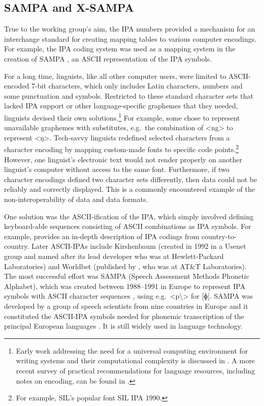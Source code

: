 \subsection*{SAMPA and X-SAMPA}
\label{sampa-xsampa}

True to the working group's aim, the IPA numbers provided a mechanism for 
an interchange standard for creating mapping tables to various 
computer encodings. For example, the IPA coding system was used as a mapping 
system in the creation of SAMPA \citep{Wells_etal1992}, an ASCII representation 
of the IPA symbols. 

For a long time, linguists, like all other computer users, were
limited to ASCII-encoded 7-bit characters, which only includes Latin characters,
numbers and some punctuation and symbols. Restricted to these standard character
sets that lacked IPA support or other language-specific graphemes that they
needed, linguists devised their own solutions.\footnote{Early work addressing
the need for a universal computing environment for writing systems and their
computational complexity is discussed in \citet{Simons1989}. A more recent survey of
practical recommendations for language resources, including notes on encoding,
can be found in \citet{BirdSimons2003}.} For example, some chose to represent
unavailable graphemes with substitutes, e.g.~the combination of <ng> to
represent <ŋ>. Tech-savvy linguists redefined selected characters from a
character encoding by mapping custom-made fonts to specific code points.\footnote{For 
example, SIL's popular font SIL IPA 1990.} However,
one linguist's electronic text would not render properly on another linguist's
computer without access to the same font. Furthermore, if two character encodings
defined two character sets differently, then data could not be reliably and
correctly displayed. This is a commonly encountered example of the non-interoperability of
data and data formats.

One solution was the ASCII-ification of the IPA, which simply involved 
defining keyboard-able sequences consisting of ASCII combinations as IPA symbols. 
For example, \citet{Wells1987} provides an in-depth description of IPA
codings from country-to-country. Later ASCII-IPAs include Kirshenbaum (created
in 1992 in a Usenet group and named after its lead developer who was at
Hewlett-Packard Laboratories) and Worldbet (published by
\citet{Hieronymus1993}, who was at AT\&T Laboratories). 
The most successful effort was SAMPA (Speech Assessment
Methods Phonetic Alphabet), which was created between 1988--1991 in Europe to 
represent IPA symbols with ASCII
character sequences \citep{Wells1987,Wells_etal1992}, using e.g.\ <p\textbackslash> 
for [ɸ]. SAMPA was developed by a group of speech scientists from nine countries 
in Europe and it constituted the ASCII-IPA symbols needed for phonemic transcription 
of the principal European languages \citep{Wells1995}. It is still widely 
used in language technology.

